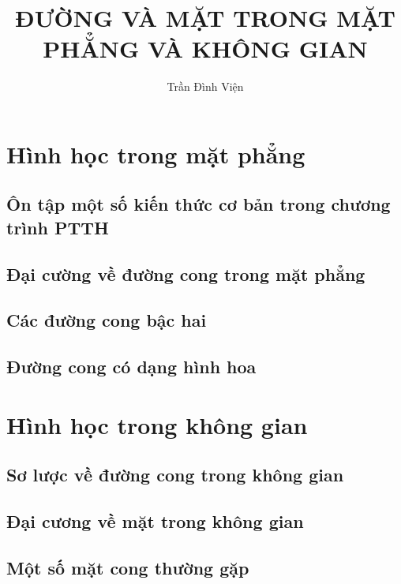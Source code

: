 \documentclass{scrreprt}
\title{ĐƯỜNG VÀ MẶT TRONG MẶT PHẲNG VÀ KHÔNG GIAN}
\author{Trần Đình Viện}
\begin{document}
\maketitle
\tableofcontents

\part{Hình học trong mặt phẳng}
\chapter{Ôn tập một số kiến thức cơ bản trong chương trình PTTH}
\chapter{Đại cường về đường cong trong mặt phẳng}
\chapter{Các đường cong bậc hai}
\chapter{Đường cong có dạng hình hoa}

\part{Hình học trong không gian}
\chapter{Sơ lược về đường cong trong không gian}
\chapter{Đại cương về mặt trong không gian}
\chapter{Một số mặt cong thường gặp}
\end{document}
